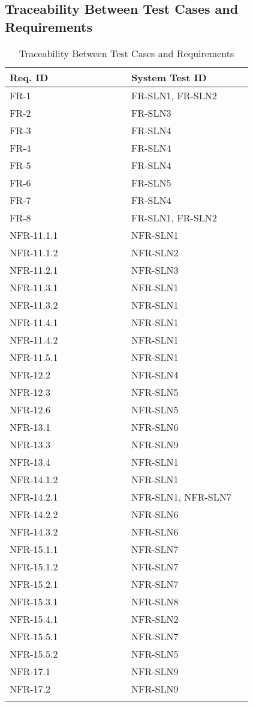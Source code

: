 \documentclass[12pt, titlepage]{article}
\begin{document}
\subsection{Traceability Between Test Cases and Requirements}

\begin{longtable}{|p{0.45\linewidth}|p{0.45\linewidth}|}
  \hline
  \textbf{Req. ID} & \textbf{System Test ID} \\
  \hline
  FR-1 & FR-SLN1, FR-SLN2 \\
  \hline
  FR-2 & FR-SLN3 \\
  \hline
  FR-3 & FR-SLN4 \\
  \hline
  FR-4 & FR-SLN4 \\
  \hline
  FR-5 & FR-SLN4 \\
  \hline
  FR-6 & FR-SLN5 \\
  \hline
  FR-7 & FR-SLN4 \\
  \hline
  FR-8 & FR-SLN1, FR-SLN2 \\
  \hline
  NFR-11.1.1 & NFR-SLN1 \\
  \hline
  NFR-11.1.2 & NFR-SLN2 \\
  \hline
  NFR-11.2.1 & NFR-SLN3 \\
  \hline
  NFR-11.3.1 & NFR-SLN1 \\
  \hline
  NFR-11.3.2 & NFR-SLN1 \\
  \hline
  NFR-11.4.1 & NFR-SLN1 \\
  \hline
  NFR-11.4.2 & NFR-SLN1 \\
  \hline
  NFR-11.5.1 & NFR-SLN1 \\
  \hline
  NFR-12.2 & NFR-SLN4 \\
  \hline
  NFR-12.3 & NFR-SLN5 \\
  \hline
  NFR-12.6 & NFR-SLN5 \\
  \hline
  NFR-13.1 & NFR-SLN6 \\
  \hline
  NFR-13.3 & NFR-SLN9 \\
  \hline
  NFR-13.4 & NFR-SLN1 \\
  \hline
  NFR-14.1.2 & NFR-SLN1 \\
  \hline
  NFR-14.2.1 & NFR-SLN1, NFR-SLN7 \\
  \hline
  NFR-14.2.2 & NFR-SLN6 \\
  \hline
  NFR-14.3.2 & NFR-SLN6 \\
  \hline
  NFR-15.1.1 & NFR-SLN7 \\
  \hline
  NFR-15.1.2 & NFR-SLN7 \\
  \hline
  NFR-15.2.1 & NFR-SLN7 \\
  \hline
  NFR-15.3.1 & NFR-SLN8 \\
  \hline
  NFR-15.4.1 & NFR-SLN2 \\
  \hline
  NFR-15.5.1 & NFR-SLN7 \\
  \hline
  NFR-15.5.2 & NFR-SLN5 \\
  \hline
  NFR-17.1 & NFR-SLN9 \\
  \hline
  NFR-17.2 & NFR-SLN9 \\
  \hline
  \caption{Traceability Between Test Cases and Requirements}
  \label{traceability}
\end{longtable}
\end{document}
